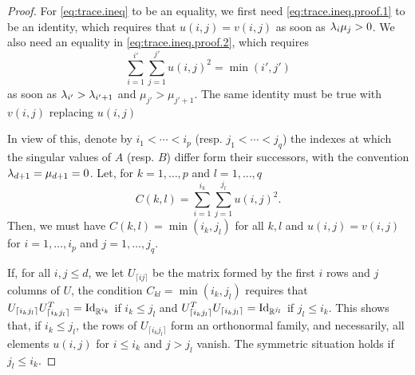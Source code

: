 \begin{proof}
For \cref{eq:trace.ineq} to be an equality, we first need \cref{eq:trace.ineq.proof.1} to be an identity, which requires that $u(i,j) = v(i,j)$ as soon as $\lambda_i\mu_j > 0$. We also need an equality in \cref{eq:trace.ineq.proof.2}, which requires 
\[
\sum_{i=1}^{i'}\sum_{j=1}^{j'} u(i,j)^2 = \min(i',j')
\]
as soon as $\lambda_{i'} > \lambda_{i'+1}$ and $\mu_{j'} > \mu_{j'+1}$. The same identity must be true with $v(i,j)$ replacing $u(i,j)$

In view of this, denote by $i_1< \cdots < i_p$ (resp. $j_1 < \cdots < j_q$) the indexes at which the singular values of $A$ (resp. $B$) differ form their successors, with the convention $\lambda_{d+1} = \mu_{d+1} = 0$. Let, for $k=1, \ldots, p$ and $l=1, \ldots, q$
\[
C(k,l) = \sum_{i=1}^{i_k}\sum_{j=1}^{j_l} u(i,j)^2.
\]
Then, we must have $C(k,l) = \min(i_k, j_l)$ for all $k,l$ and $u(i,j) = v(i,j)$ for $i=1, \ldots, i_p$ and $j=1, \ldots, j_q$. 

If, for all $i,j\leq d$, we let $U_{\lceil ij\rceil}$ be the matrix formed by the first $i$ rows and $j$ columns of $U$, the condition $C_{kl} = \min(i_k, j_l)$ requires that $U_{\lceil i_kj_l\rceil}U_{\lceil i_kj_l\rceil}^T =\Id[i_k]$ if $i_k\leq j_l$ and $U_{\lceil i_kj_l\rceil}^TU_{\lceil i_kj_l\rceil} =\Id[j_l]$ if $j_l\leq i_k$.
This shows that, if $i_k\leq j_l$,  the rows of $U_{\lceil i_kj_l\rceil}$ form an orthonormal family, and necessarily, all elements $u(i,j)$ for $i\leq i_k$ and $j>j_l$ vanish. The symmetric situation holds if $j_l\leq i_k$.


\end{proof}
